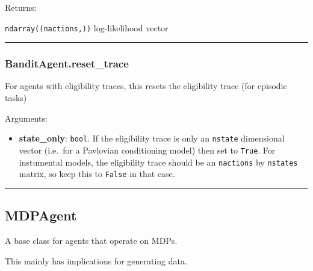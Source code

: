 Returns:

\texttt{ndarray((nactions,))} log-likelihood vector

\begin{center}\rule{0.5\linewidth}{\linethickness}\end{center}

\subsubsection{BanditAgent.reset\_trace}\label{banditagent.reset_trace}

\begin{Shaded}
\begin{Highlighting}[]
\OperatorTok{=}\NormalTok{)}
\end{Highlighting}
\end{Shaded}

For agents with eligibility traces, this resets the eligibility trace
(for episodic tasks)

Arguments:

\begin{itemize}
\tightlist
\item
  \textbf{state\_only}: \texttt{bool}. If the eligibility trace is only
  an \texttt{nstate} dimensional vector (i.e.~for a Pavlovian
  conditioning model) then set to \texttt{True}. For instumental models,
  the eligibility trace should be an \texttt{nactions} by
  \texttt{nstates} matrix, so keep this to \texttt{False} in that case.
\end{itemize}

\begin{center}\rule{0.5\linewidth}{\linethickness}\end{center}

\subsection{MDPAgent}\label{mdpagent}

\begin{Shaded}
\begin{Highlighting}[]
\end{Highlighting}
\end{Shaded}

A base class for agents that operate on MDPs.

This mainly has implications for generating data.

